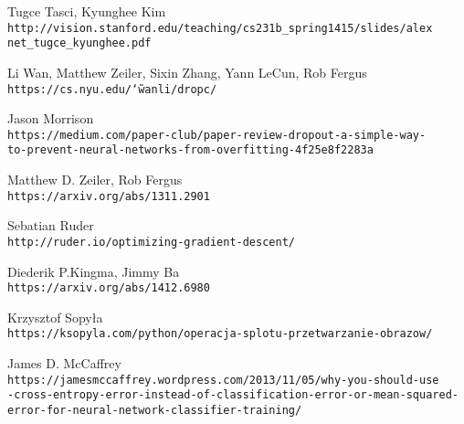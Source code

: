 \begin{thebibliography}{99}
Tugce Tasci, Kyunghee Kim
\\\texttt{http://vision.stanford.edu/teaching/cs231b\_spring1415/slides/alex\\net\_tugce\_kyunghee.pdf}

Li Wan, Matthew Zeiler, Sixin Zhang, Yann LeCun, Rob Fergus
\\\texttt{https://cs.nyu.edu/\char`\~wanli/dropc/}

Jason Morrison
\\\texttt{https://medium.com/paper-club/paper-review-dropout-a-simple-way-\\to-prevent-neural-networks-from-overfitting-4f25e8f2283a}

Matthew D. Zeiler, Rob Fergus
\\\texttt{https://arxiv.org/abs/1311.2901}

Sebatian Ruder
\\\texttt{http://ruder.io/optimizing-gradient-descent/}

Diederik P.Kingma, Jimmy Ba
\\\texttt{https://arxiv.org/abs/1412.6980}

Krzysztof Sopyła
\\\texttt{https://ksopyla.com/python/operacja-splotu-przetwarzanie-obrazow/}

James D. McCaffrey
\\\texttt{https://jamesmccaffrey.wordpress.com/2013/11/05/why-you-should-use\\-cross-entropy-error-instead-of-classification-error-or-mean-squared-\\error-for-neural-network-classifier-training/}

\end{thebibliography}
